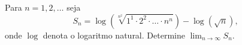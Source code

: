 Para \(n = 1, 2, \ldots\) seja
\[
S_n = \log\!\left(\sqrt[n^2]{1^1 \cdot 2^2 \cdot \ldots \cdot n^n}\right) - \log(\sqrt{n}),
\]
onde \(\log\) denota o logaritmo natural. Determine \(\displaystyle\lim_{n \to \infty} S_n\).
